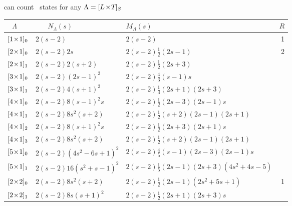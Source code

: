 \begin{frame}{can count \catlatt\ states for any $\Lambda={[{L_{}}\!\times\!{T_{}}]_{S_{}}}$}
\begin{center}
{\scriptsize
\begin{tabular}{lllr}
\\[-16pt]
$~~~\Lambda$
                         & ~~~$N_\Lambda(s)$ & $M_\Lambda(s)$
                                                 &$R$  \\
\hline
${[1\!\times\!1]_{0}}$    &   $2({s}-2)$ & $2({s}-2)$ & 1 \\
${[2\!\times\!1]_{0}}$    &   $2({s}-2)2s$ & $2({s}-2)\frac{1}{2}(2{s}-1)$   & 2 \\
${[2\!\times\!1]_{1}}$  &   $2({s}-2)2({s}+2)$ & $2({s}-2)\frac{1}{2}(2{s}+3)$  & \\
${[3\!\times\!1]_{0}}$    &   $2({s}-2)(2{s}-1)^2$ & $2({s}-2)\frac{4}{3}({s}-1){s}$ &  \\
${[3\!\times\!1]_{1}}$  &   $2({s}-2)4({s}+1)^2$ & $2({s}-2)\frac{1}{3}(2{s}+1)(2{s}+3)$ & \\
${[4\!\times\!1]_{0}}$    &   $2({s}-2)8({s}-1)^2{s}$ & $2({s}-2)\frac{1}{2}(2{s}-3)(2{s}-1)s$ & \\
${[4\!\times\!1]_{1}}$  &   $2({s}-2)8s^2({s}+2)$ & $2({s}-2)\frac{1}{2}({s}+2)(2{s}-1)(2{s}+1)$ & \\
${[4\!\times\!1]_{2}}$  &   $2({s}-2)8({s}+1)^2{s}$ & $2({s}-2)\frac{1}{2}(2{s}+3)(2{s}+1)s$     & \\
${[4\!\times\!1]_{3}}$  &   $2({s}-2)8s^2({s}+2)$ & $2({s}-2)\frac{1}{2}({s}+2)(2{s}-1)(2{s}+1)$ &  \\
${[5\!\times\!1]_{0}}$    & $2({s}-2)\left(4{s}^2-6{s}+1\right)^2$ & $2({s}-2)\frac{4}{5}({s}-1)(2{s}-3)(2{s}-1)s$
                                  & \\
${[5\!\times\!1]_{1}}$  & $2({s}-2)16\left({s}^2+{s}-1\right)^2$ & $2({s}-2)\frac{1}{5}(2{s}-1)(2{s}+3)(4{s}^2+4{s}-5)$
                                  & \\
${[2\!\times\!2]_{0}}$    & $2({s}-2)8s^2({s}+2)$ & $2({s}-2)\frac{1}{2}(2{s}-1)(2{s}^2+5{s}+1)$  & 1 \\
${[2\!\times\!2]_{1}}$  & $2(s-2)8s (s+1)^2$ & $2({s}-2)\frac{1}{2}(2{s}+1)(2{s}+3)s$ &  \\

\end{tabular}}
\end{center}
\end{frame}
